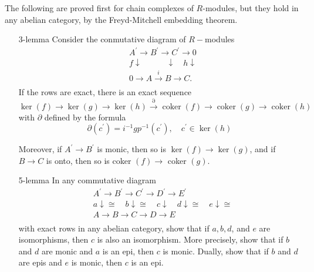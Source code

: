 \begin{prop}The following are proved first for chain complexes of $R$-modules, but they hold in any abelian category, by the Freyd-Mitchell embedding theorem.
    \begin{enumerate}
      \item[3-lemma] Consider the conmutative diagram of $R-$modules
       $$\begin{aligned} & A^{\prime} \longrightarrow B^{\prime} \longrightarrow C^{\prime} \longrightarrow 0 \\ & f \downarrow \quad \quad \quad \downarrow \quad h \downarrow \\ & 0 \longrightarrow A \xrightarrow{i} B \longrightarrow C . \\ & \end{aligned}$$ If the rows are exact, there is an exact sequence
       $$
       \operatorname{ker}(f) \rightarrow \operatorname{ker}(g) \rightarrow \operatorname{ker}(h) \xrightarrow{\partial} \operatorname{coker}(f) \rightarrow \operatorname{coker}(g) \rightarrow \operatorname{coker}(h)
       $$
       with $\partial$ defined by the formula
       $$
       \partial\left(c^{\prime}\right)=i^{-1} g p^{-1}\left(c^{\prime}\right), \quad c^{\prime} \in \operatorname{ker}(h)
       $$
       
       Moreover, if $A^{\prime} \rightarrow B^{\prime}$ is monic, then so is $\operatorname{ker}(f) \rightarrow \operatorname{ker}(g)$, and if $B \rightarrow C$ is onto, then so is coker $(f) \rightarrow$ coker $(g)$.
  
       \item[5-lemma] In any commutative diagram
       $$
       \begin{aligned}
       & A^{\prime} \longrightarrow B^{\prime} \longrightarrow C^{\prime} \longrightarrow D^{\prime} \longrightarrow E^{\prime} \\
       & a \downarrow \cong \quad b \downarrow \cong \quad c \downarrow \quad d \downarrow \cong \quad e \downarrow \cong \\
       & A \longrightarrow B \longrightarrow C \longrightarrow D \longrightarrow E \\
       &
       \end{aligned}
       $$
       with exact rows in any abelian category, show that if $a, b, d$, and $e$ are isomorphisms, then $c$ is also an isomorphism. More precisely, show that if $b$ and $d$ are monic and $a$ is an epi, then $c$ is monic. Dually, show that if $b$ and $d$ are epis and $e$ is monic, then $c$ is an epi.
    \end{enumerate}  
  \end{prop}
  
